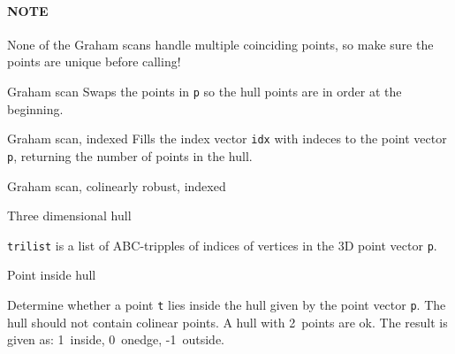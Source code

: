 
\paragraph{NOTE} None of the Graham scans handle multiple coinciding points,
so make sure the points are unique before calling!

\begin{algorithm}{Graham scan}
\desc
Swaps the points in {\tt p} so the hull points are in order at the beginning.
\end{algorithm}

\begin{algorithm}{Graham scan, indexed}
\desc
Fills the index vector {\tt idx} with indeces to the point vector {\tt p},
returning the number of points in the hull.
\end{algorithm}

\begin{algorithm}{Graham scan, colinearly robust, indexed}

\end{algorithm}

\begin{algorithm}{Three dimensional hull}


\desc
{\tt trilist} is a list of ABC-tripples of indices of vertices in the 3D
point vector {\tt p}.
\end{algorithm}

\begin{algorithm}{Point inside hull}

\desc
Determine whether a point {\tt t} lies inside the hull given by the
point vector {\tt p}. The hull should not contain colinear points. A hull with
2~points are ok. The result is given as: 1~inside, 0~onedge, -1~outside.
\end{algorithm}

